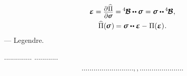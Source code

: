 \nopagebreak\vspace{-0.1em}
\begin{equation}\label{the Legendre transform}
\begin{gathered}
\infinitesimaldeformation
= \scalebox{.9}{$
   \displaystyle
   \frac{ \raisemath{-0.2em}{
      \partial \hspace{.1ex} \widehat{\potential}
   } }
   { \raisemath{.04em}{\partial \linearstress} }
$}
= \hspace{-0.12ex} \pliabilitytensor \dotdotp \linearstress
\hspace{.1ex} =
\linearstress \dotdotp \hspace{-0.1ex} \pliabilitytensor
\hspace{.1ex} ,
\\
\widehat{\potential}( \hspace{-0.1ex}\linearstress\hspace{.12ex}) \hspace{-0.1ex}
= \linearstress \dotdotp \infinitesimaldeformation
- \hspace{.1ex} \potential(\infinitesimaldeformation)
\hspace{.1ex} .
\end{gathered}
\end{equation}\:---
Legendre.

..............
............

\begin{equation*}
.........................
.,,......................
\end{equation*}


